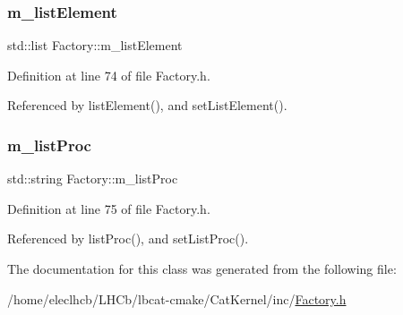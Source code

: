 \mbox{\label{classFactory_a83a99d80105fab2371ce03230b90e8a3}} 
\subsubsection{\texorpdfstring{m\+\_\+list\+Element}{m\_listElement}}
{\footnotesize\ttfamily std\+::list Factory\+::m\+\_\+list\+Element\hspace{0.3cm}{\ttfamily [private]}}



Definition at line 74 of file Factory.\+h.



Referenced by list\+Element(), and set\+List\+Element().

\mbox{\label{classFactory_aec20c1d0a1ef175f55a82e868edabe88}} 
\subsubsection{\texorpdfstring{m\+\_\+list\+Proc}{m\_listProc}}
{\footnotesize\ttfamily std\+::string Factory\+::m\+\_\+list\+Proc\hspace{0.3cm}{\ttfamily [private]}}



Definition at line 75 of file Factory.\+h.



Referenced by list\+Proc(), and set\+List\+Proc().



The documentation for this class was generated from the following file\+:\begin{DoxyCompactItemize}
\item 
/home/eleclhcb/\+L\+H\+Cb/lbcat-\/cmake/\+Cat\+Kernel/inc/\hyperlink{Factory_8h}{Factory.\+h}\end{DoxyCompactItemize}
